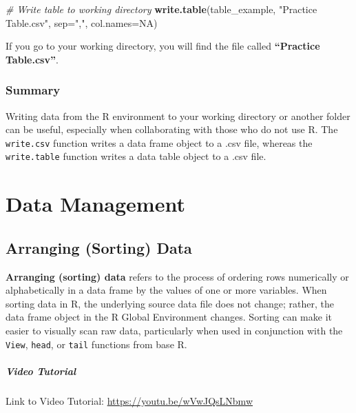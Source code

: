 \documentclass[]{book}
\newenvironment{Shaded}{\begin{snugshade}}{\end{snugshade}}
\newcommand{\KeywordTok}[1]{\textcolor[rgb]{0.13,0.29,0.53}{\textbf{#1}}}
\newcommand{\DataTypeTok}[1]{\textcolor[rgb]{0.13,0.29,0.53}{#1}}
\newcommand{\StringTok}[1]{\textcolor[rgb]{0.31,0.60,0.02}{#1}}
\newcommand{\CommentTok}[1]{\textcolor[rgb]{0.56,0.35,0.01}{\textit{#1}}}
\newcommand{\OtherTok}[1]{\textcolor[rgb]{0.56,0.35,0.01}{#1}}
\newcommand{\NormalTok}[1]{#1}
\begin{document}
\begin{Shaded}
\begin{Highlighting}[]
\CommentTok{# Write table to working directory}
\KeywordTok{write.table}\NormalTok{(table_example, }\StringTok{"Practice Table.csv"}\NormalTok{, }\DataTypeTok{sep=}\StringTok{","}\NormalTok{, }\DataTypeTok{col.names=}\OtherTok{NA}\NormalTok{)}
\end{Highlighting}
\end{Shaded}

If you go to your working directory, you will find the file called
\textbf{``Practice Table.csv''}.

\section{Summary}\label{summary}

Writing data from the R environment to your working directory or another
folder can be useful, especially when collaborating with those who do
not use R. The \texttt{write.csv} function writes a data frame object to
a .csv file, whereas the \texttt{write.table} function writes a data
table object to a .csv file.

\part{Data Management}\label{part-data-management}

\hypertarget{arrange}{\chapter{Arranging (Sorting) Data}\label{arrange}}

\textbf{Arranging (sorting) data} refers to the process of ordering rows
numerically or alphabetically in a data frame by the values of one or
more variables. When sorting data in R, the underlying source data file
does not change; rather, the data frame object in the R Global
Environment changes. Sorting can make it easier to visually scan raw
data, particularly when used in conjunction with the \texttt{View},
\texttt{head}, or \texttt{tail} functions from base R.

\subsubsection{Video Tutorial}\label{video-tutorial}

Link to Video Tutorial: \url{https://youtu.be/wVwJQsLNbmw}
\end{document}
